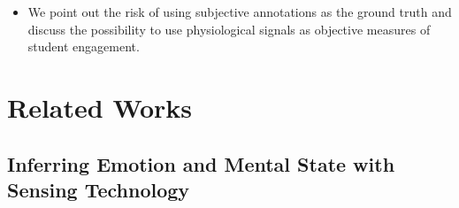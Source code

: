 \documentclass[sigconf]{acmart}
\begin{document}
\begin{itemize}
    \item We point out the risk of using subjective annotations as the ground truth and discuss the possibility to use physiological signals as objective measures of student engagement. 
\end{itemize}


\section{Related Works}
\label{sec:relatedwork}

\subsection{Inferring Emotion and Mental State with Sensing Technology}
\end{document}
